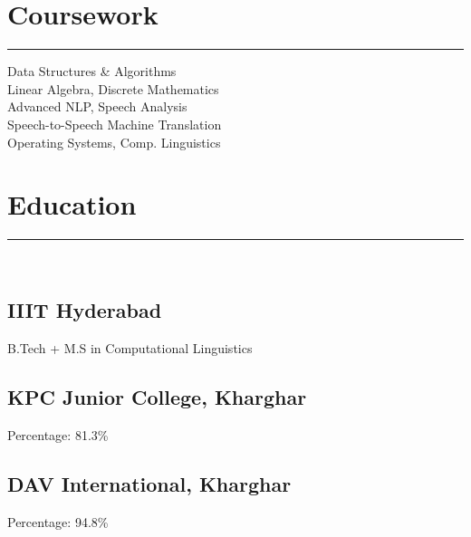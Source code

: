 \documentclass[]{rahulworld-resume}
\begin{document}
\begin{minipage}[t]{0.32\textwidth}
\sectionsep
\section{Coursework}
\noindent\rule{5cm}{0.4pt}

Data Structures \& Algorithms\\
Linear Algebra, Discrete Mathematics\\
Advanced NLP, Speech Analysis\\
Speech-to-Speech Machine Translation\\
Operating Systems, Comp. Linguistics
\sectionsep

\section{Education}
\noindent\rule{5cm}{0.4pt}\\

\subsection{IIIT Hyderabad}
B.Tech + M.S in Computational Linguistics

\vspace{8pt}
\subsection{KPC Junior College, Kharghar}
Percentage: 81.3\%

\vspace{8pt}
\subsection{DAV International, Kharghar}
Percentage: 94.8\%

\end{minipage}
\hfill
%
%
\end{document}
